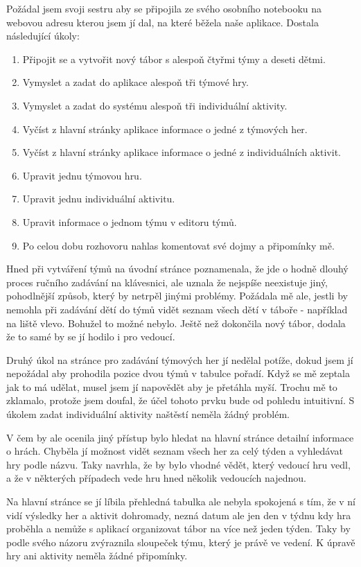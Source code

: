 \documentclass[a4paper, 12pt]{article} %
\begin{document}
Požádal jsem svoji sestru aby se připojila ze svého osobního notebooku na webovou adresu kterou jsem jí dal, na které běžela naše aplikace. Dostala následující úkoly:
\begin{enumerate}
    \item Připojit se a vytvořit nový tábor s alespoň čtyřmi týmy a deseti dětmi.
    \item Vymyslet a zadat do aplikace alespoň tři týmové hry.
    \item Vymyslet a zadat do systému alespoň tři individuální aktivity.
    \item Vyčíst z hlavní stránky aplikace informace o jedné z týmových her.
    \item Vyčíst z hlavní stránky aplikace informace o jedné z individuálních aktivit.
    \item Upravit jednu týmovou hru.
    \item Upravit jednu individuální aktivitu.
    \item Upravit informace o jednom týmu v editoru týmů.
    \item Po celou dobu rozhovoru nahlas komentovat své dojmy a připomínky mě.
\end{enumerate}
Hned při vytváření týmů na úvodní stránce poznamenala, že jde o hodně dlouhý proces ručního zadávání na klávesnici, ale uznala že nejspíše neexistuje jiný, pohodlnější způsob, který by netrpěl jinými problémy.
Požádala mě ale, jestli by nemohla při zadávání dětí do týmů vidět seznam všech dětí v táboře - například na liště vlevo. Bohužel to možné nebylo.
Ještě než dokončila nový tábor, dodala že to samé by se jí hodilo i pro vedoucí.

Druhý úkol na stránce pro zadávání týmových her jí nedělal potíže, dokud jsem jí nepožádal aby prohodila pozice dvou týmů v tabulce pořadí. Když se mě zeptala jak to má udělat, musel jsem jí napovědět aby je přetáhla myší. Trochu mě to zklamalo, protože jsem doufal, že účel tohoto prvku bude od pohledu intuitivní. S úkolem zadat individuální aktivity naštěstí neměla žádný problém.

V čem by ale ocenila jiný přístup bylo hledat na hlavní stránce detailní informace o hrách. Chyběla jí možnost vidět seznam všech her za celý týden a vyhledávat hry podle názvu. Taky navrhla, že by bylo vhodné vědět, který vedoucí hru vedl, a že v některých případech vede hru hned několik vedoucích najednou.

Na hlavní stránce se jí líbila přehledná tabulka ale nebyla spokojená s tím, že v ní vidí výsledky her a aktivit dohromady, nezná datum ale jen den v týdnu kdy hra proběhla a nemůže s aplikací organizovat tábor na více než jeden týden. Taky by podle svého názoru zvýraznila sloupeček týmu, který je právě ve vedení. K úpravě hry ani aktivity neměla žádné připomínky.
\end{document}
